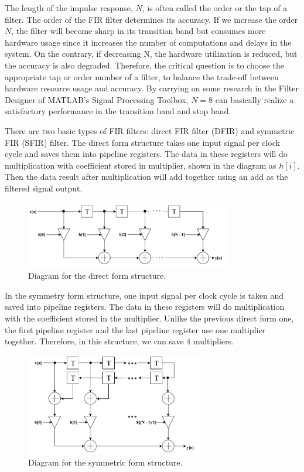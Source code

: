 \documentclass[a4paper,12pt,twoside]{article}
\begin{document}
The length of the impulse response, $N$, is often called the order or the tap of a filter. The order of the FIR filter determines its accuracy. If we increase the order $N$, the filter will become sharp in its transition band but consumes more hardware usage since it increases the number of computations and delays in the system. On the contrary, if decreasing N, the hardware utilization is reduced, but the accuracy is also degraded. Therefore, the critical question is to choose the appropriate tap or order number of a filter, to balance the trade-off between hardware resource usage and accuracy. By carrying on some research in the Filter Designer of MATLAB's Signal Processing Toolbox, $N=8$ can basically realize a satisfactory performance in the transition band and stop band.

There are two basic types of FIR filters: direct FIR filter (DFIR) and symmetric FIR (SFIR) filter. The direct form structure takes one input signal per clock cycle and saves them into pipeline registers. The data in these registers will do multiplication with coefficient stored in multiplier, shown in the diagram as $h[i]$. Then the data result after multiplication will add together using an add as the filtered signal output.
\begin{figure}[H]
    \centering
    \includegraphics[width=0.8\textwidth]{images/27.png}
    \caption{Diagram for the direct form structure.}
\end{figure}
In the symmetry form structure, one input signal per clock cycle is taken and saved into pipeline registers. The data in these registers will do multiplication with the coefficient stored in the multiplier. Unlike the previous direct form one, the first pipeline register and the last pipeline register use one multiplier together. Therefore, in this structure, we can save 4 multipliers.
\begin{figure}[H]
    \centering
    \includegraphics[width=0.7\textwidth]{images/28.png}
    \caption{Diagram for the symmetric form structure.}
\end{figure}
\end{document}
